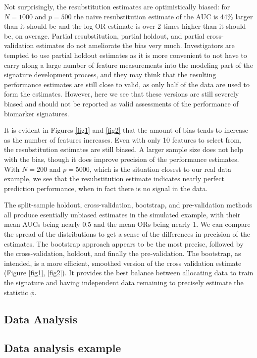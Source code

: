 \documentclass[11pt,]{article}
\begin{document}
Not surprisingly, the resubstitution estimates are optimistically
biased: for \(N = 1000\) and \(p = 500\) the naive resubstitution
estimate of the AUC is 44\% larger than it should be and the log OR
estimate is over 2 times higher than it should be, on average. Partial
resubstitution, partial holdout, and partial cross-validation estimates
do not ameliorate the bias very much. Investigators are tempted to use
partial holdout estimates as it is more convenient to not have to carry
along a large number of feature measurements into the modeling part of
the signature development process, and they may think that the resulting
performance estimates are still close to valid, as only half of the data
are used to form the estimates. However, here we see that these versions
are still severely biased and should not be reported as valid
assessments of the performance of biomarker signatures.

It is evident in Figures \ref{fig1} and \ref{fig2} that the amount of
bias tends to increase as the number of features increases. Even with
only 10 features to select from, the resubstitution estimates are still
biased. A larger sample size does not help with the bias, though it does
improve precision of the performance estimates. With \(N = 200\) and
\(p = 5000\), which is the situation closest to our real data example,
we see that the resubstitution estimate indicates nearly perfect
prediction performance, when in fact there is no signal in the data.

The split-sample holdout, cross-validation, bootstrap, and
pre-validation methods all produce esentially unbiased estimates in the
simulated example, with their mean AUCs being nearly 0.5 and the mean
ORs being nearly 1. We can compare the spread of the distributions to
get a sense of the differences in precision of the estimates. The
bootstrap approach appears to be the most precise, followed by the
cross-validation, holdout, and finally the pre-validation. The
bootstrap, as intended, is a more efficient, smoothed version of the
cross validation estimate (Figure \ref{fig1}, \ref{fig2}). It provides
the best balance between allocating data to train the signature and
having independent data remaining to precisely estimate the statistic
\(\phi\).

\subsection{Data Analysis}\label{data-analysis}

\subsection{Data analysis example}\label{data-analysis-example}
\end{document}
